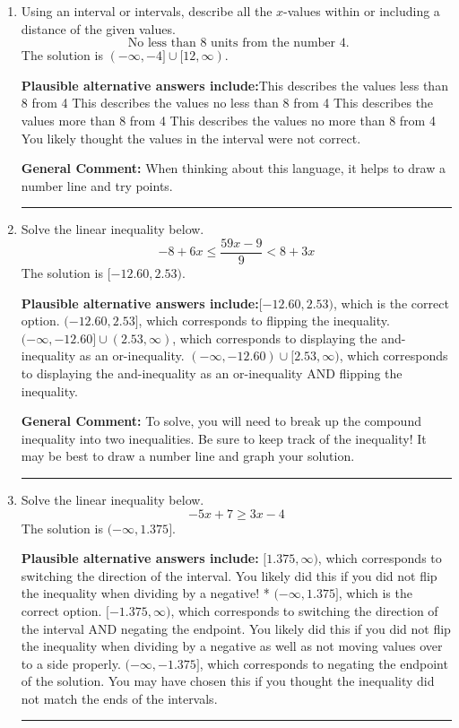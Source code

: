 \documentclass{extbook}[14pt]
\newcommand{\litem}[1]{\item #1

\rule{\textwidth}{0.4pt}}
\begin{document}
\begin{enumerate}\litem{
Using an interval or intervals, describe all the $x$-values within or including a distance of the given values.
\[ \text{ No less than } 8 \text{ units from the number } 4. \]The solution is \( (-\infty, -4] \cup [12, \infty) \).\begin{enumerate}[label=\Alph*.]
\textbf{Plausible alternative answers include:}This describes the values less than 8 from 4
This describes the values no less than 8 from 4
This describes the values more than 8 from 4
This describes the values no more than 8 from 4
You likely thought the values in the interval were not correct.
\end{enumerate}

\textbf{General Comment:} When thinking about this language, it helps to draw a number line and try points.
}
\litem{
Solve the linear inequality below.
\[ -8 + 6 x \leq \frac{59 x - 9}{9} < 8 + 3 x \]The solution is \( [-12.60, 2.53) \).\begin{enumerate}[label=\Alph*.]
\textbf{Plausible alternative answers include:}$[-12.60, 2.53)$, which is the correct option.
$(-12.60, 2.53]$, which corresponds to flipping the inequality.
$(-\infty, -12.60] \cup (2.53, \infty)$, which corresponds to displaying the and-inequality as an or-inequality.
$(-\infty, -12.60) \cup [2.53, \infty)$, which corresponds to displaying the and-inequality as an or-inequality AND flipping the inequality.

\end{enumerate}

\textbf{General Comment:} To solve, you will need to break up the compound inequality into two inequalities. Be sure to keep track of the inequality! It may be best to draw a number line and graph your solution.
}
\litem{
Solve the linear inequality below.
\[ -5x + 7 \geq 3x -4 \]The solution is \( (-\infty, 1.375] \).\begin{enumerate}[label=\Alph*.]
\textbf{Plausible alternative answers include:} $[1.375, \infty)$, which corresponds to switching the direction of the interval. You likely did this if you did not flip the inequality when dividing by a negative!
* $(-\infty, 1.375]$, which is the correct option.
 $[-1.375, \infty)$, which corresponds to switching the direction of the interval AND negating the endpoint. You likely did this if you did not flip the inequality when dividing by a negative as well as not moving values over to a side properly.
 $(-\infty, -1.375]$, which corresponds to negating the endpoint of the solution.
You may have chosen this if you thought the inequality did not match the ends of the intervals.
\end{enumerate}

}
\end{enumerate}
\end{document}
